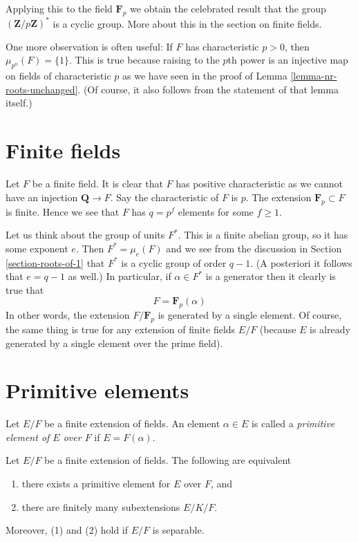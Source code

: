 \noindent
Applying this to the field $\mathbf{F}_p$ we obtain the celebrated result
that the group $(\mathbf{Z}/p\mathbf{Z})^*$ is a cyclic group. More about
this in the section on finite fields.

\medskip\noindent
One more observation is often useful: If $F$ has characteristic
$p > 0$, then $\mu_{p^n}(F) = \{1\}$. This is true because raising
to the $p$th power is an injective map on fields of characteristic $p$
as we have seen in the proof of Lemma \ref{lemma-nr-roots-unchanged}.
(Of course, it also follows from the statement of that lemma itself.)






\section{Finite fields}
\label{section-finite}

\noindent
Let $F$ be a finite field. It is clear that $F$ has positive characteristic
as we cannot have an injection $\mathbf{Q} \to F$. Say the characteristic
of $F$ is $p$. The extension $\mathbf{F}_p \subset F$ is finite.
Hence we see that $F$ has $q = p^f$ elements for some $f \geq 1$.

\medskip\noindent
Let us think about the group of units $F^*$. This is a finite abelian
group, so it has some exponent $e$. Then $F^* = \mu_e(F)$ and we see
from the discussion in Section \ref{section-roots-of-1} that $F^*$
is a cyclic group of order $q - 1$. (A posteriori it follows that
$e = q - 1$ as well.) In particular, if $\alpha \in F^*$ is a generator
then it clearly is true that
$$
F = \mathbf{F}_p(\alpha)
$$
In other words, the extension $F/\mathbf{F}_p$ is generated by a single
element. Of course, the same thing is true for any extension of finite
fields $E/F$ (because $E$ is already generated by a single element over
the prime field).





\section{Primitive elements}
\label{section-primitive-element}

\noindent
Let $E/F$ be a finite extension of fields. An element $\alpha \in E$
is called a {\it primitive element of $E$ over $F$} if $E = F(\alpha)$.

\begin{lemma}
\label{lemma-primitive-element}
Let $E/F$ be a finite extension of fields. The following are equivalent
\begin{enumerate}
\item there exists a primitive element for $E$ over $F$, and
\item there are finitely many subextensions $E/K/F$.
\end{enumerate}
Moreover, (1) and (2) hold if $E/F$ is separable.
\end{lemma}

